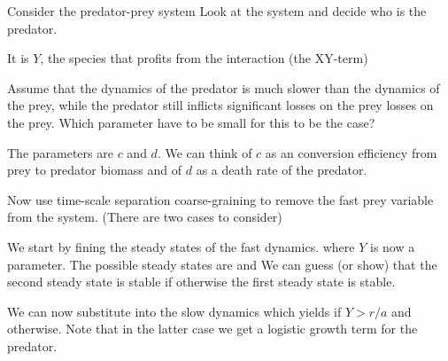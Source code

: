Consider the predator-prey system 
\subquestion Look at the system and decide who is the predator. 

\solution 
It is $Y$, the species that profits from the interaction (the XY-term)

\subquestion
Assume that the dynamics of the predator is much slower than the dynamics of the prey, while the predator still inflicts significant losses on the prey losses on the prey. Which parameter have to be small for this to be the case?

\solution 
The parameters are $c$ and $d$. We can think of $c$ as an conversion efficiency from prey to predator biomass and of $d$ as a death rate of the predator. 

\subquestion
Now use time-scale separation coarse-graining to remove the fast prey variable from the system. (There are two cases to consider)

\solution 
We start by fining the steady states of the fast dynamics. 
where $Y$ is now a parameter. The possible steady states are 
and
We can guess (or show) that the second steady state is stable if 
otherwise the first steady state is stable. 

We can now substitute into the slow dynamics  
which yields 
if $Y>r/a$ and
otherwise. Note that in the latter case we get a logistic growth term for the predator. 
